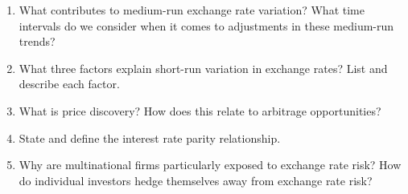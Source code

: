 \documentclass[12pt]{article}
\begin{document}
\begin{enumerate}[1)]
\item What contributes to medium-run exchange rate variation? What time intervals do we consider when it comes to adjustments in these medium-run trends?

\vspace{1.5in}

\item What three factors explain short-run variation in exchange rates? List and describe each factor.

\vspace{1.5in}

\item What is price discovery? How does this relate to arbitrage opportunities?

\vspace{1.5in}

\item State and define the interest rate parity relationship.

\vspace{1.5in}


\item  Why are multinational firms particularly exposed to exchange rate risk? How do individual investors hedge themselves away from exchange rate risk?



\end{enumerate}
\end{document}
